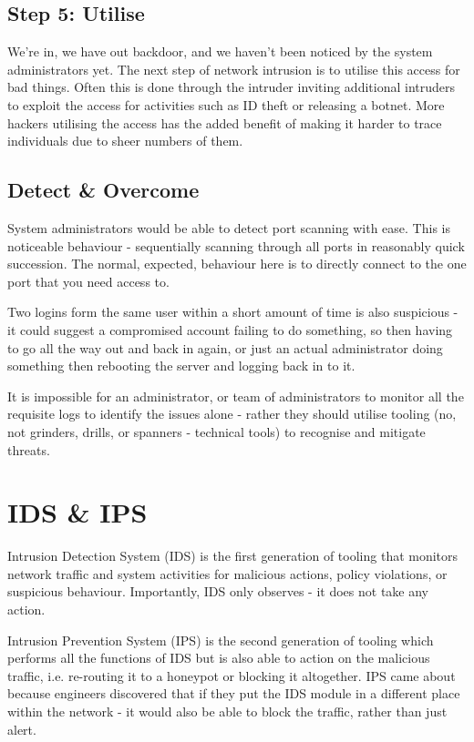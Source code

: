 \subsection{Step 5: Utilise}
We're in, we have out backdoor, and we haven't been noticed by the system administrators yet. The next step of network intrusion is to utilise this access for bad things. Often this is done through the intruder inviting additional intruders to exploit the access for activities such as ID theft or releasing a botnet. More hackers utilising the access has the added benefit of making it harder to trace individuals due to sheer numbers of them. 

\subsection{Detect \& Overcome}
System administrators would be able to detect port scanning with ease. This is noticeable behaviour - sequentially scanning through all ports in reasonably quick succession. The normal, expected, behaviour here is to directly connect to the one port that you need access to. 

Two logins form the same user within a short amount of time is also suspicious - it could suggest a compromised account failing to do something, so then having to go all the way out and back in again, or just an actual administrator doing something then rebooting the server and logging back in to it. 

It is impossible for an administrator, or team of administrators to monitor all the requisite logs to identify the issues alone - rather they should utilise tooling (no, not grinders, drills, or spanners - technical tools) to recognise and mitigate threats. 

\section{IDS \& IPS}
Intrusion Detection System (IDS) is the first generation of tooling that monitors network traffic and system activities for malicious actions, policy violations, or suspicious behaviour. Importantly, IDS only observes - it does not take any action.

Intrusion Prevention System (IPS) is the second generation of tooling which performs all the functions of IDS but is also able to action on the malicious traffic, i.e. re-routing it to a honeypot or blocking it altogether. IPS came about because engineers discovered that if they put the IDS module in a different place within the network - it would also be able to block the traffic, rather than just alert. 


